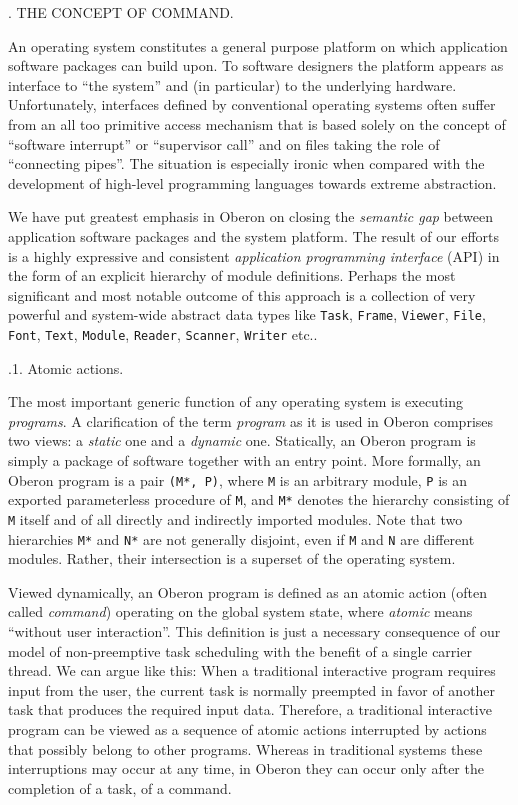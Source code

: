 . THE CONCEPT OF COMMAND.

An operating system constitutes a general purpose platform on which
application software packages can build upon. To software designers
the platform appears as interface to ``the system'' and (in particular)
to the underlying hardware. Unfortunately, interfaces defined by
conventional operating systems often suffer from an all too primitive
access mechanism that is based solely on the concept of ``software interrupt''
or ``supervisor call'' and on files taking the role of
``connecting pipes''. The situation is especially ironic when compared
with the development of high-level programming languages towards
extreme abstraction.

We have put greatest emphasis in Oberon on closing the {\it semantic gap\/}
between application software packages and the system platform. The
result of our efforts is a highly expressive and consistent
{\it application programming interface\/} (API) in the form of an explicit
hierarchy of module definitions. Perhaps the most significant and most
notable outcome of this approach is a collection of very powerful and
system-wide abstract data types like
{\tt Task\/}, {\tt Frame\/}, {\tt Viewer\/}, {\tt File\/}, {\tt Font\/},
{\tt Text\/}, {\tt Module\/}, {\tt Reader\/}, {\tt Scanner\/}, {\tt Writer\/} etc..

.1. Atomic actions.

The most important generic function of any operating system is
executing {\it programs\/}. A clarification of the term {\it program\/} as it is used
in Oberon comprises two views: a {\it static\/} one and a {\it dynamic\/}
one. Statically, an Oberon program is simply a package of software
together with an entry point. More formally, an Oberon program is a
pair {\tt (M*, P)\/}, where {\tt M\/} is an arbitrary module, {\tt P\/} is an exported
parameterless procedure of {\tt M\/}, and {\tt M*\/} denotes the hierarchy consisting
of {\tt M\/} itself and of all directly and indirectly imported modules. Note
that two hierarchies {\tt M*\/} and {\tt N*\/} are not generally disjoint, even if {\tt M\/}
and {\tt N\/} are different modules. Rather, their intersection is a superset
of the operating system.

Viewed dynamically, an Oberon program is defined as an atomic action
(often called {\it command\/}) operating on the global system state, where
{\it atomic\/} means ``without user interaction''. This definition is just a
necessary consequence of our model of non-preemptive task scheduling
with the benefit of a single carrier thread. We can argue like this:
When a traditional interactive program requires input from the user,
the current task is normally preempted in favor of another task that
produces the required input data. Therefore, a traditional interactive
program can be viewed as a sequence of atomic actions interrupted by
actions that possibly belong to other programs. Whereas in traditional
systems these interruptions may occur at any time, in Oberon they can
occur only after the completion of a task, of a command.


